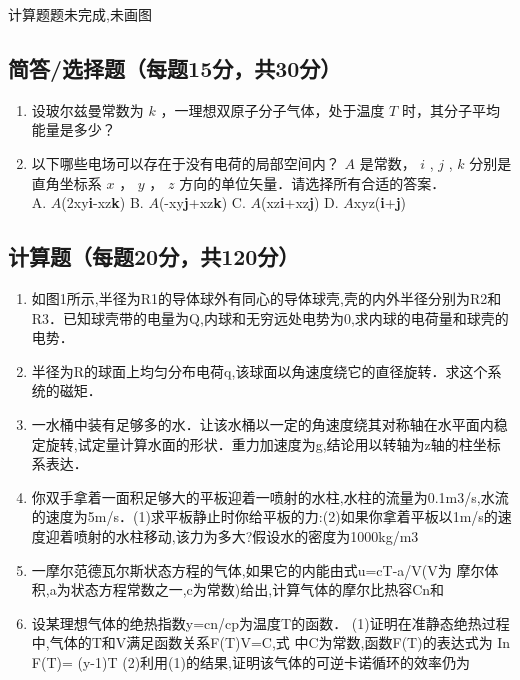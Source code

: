 
\begin{issues}
\issueTODO
计算题题未完成,未画图
\end{issues}


\subsection{简答/选择题（每题15分，共30分）}
\begin{enumerate}
\item 设玻尔兹曼常数为 $k$ ，一理想双原子分子气体，处于温度 $T$ 时，其分子平均能量是多少？
\item 以下哪些电场可以存在于没有电荷的局部空间内？ $A$ 是常数， $i$ , $j$ , $k$ 分别是直角坐标系 $x$ ， $y$ ， $z$ 方向的单位矢量．请选择所有合适的答案．\\
A. $A$(2xy\textbf{i}-xz\textbf{k}) B. $A$(-xy\textbf{j}+xz\textbf{k}) C. $A$(xz\textbf{i}+xz\textbf{j}) D. $A$xyz(\textbf{i}+\textbf{j})
\end{enumerate}
\subsection{计算题（每题20分，共120分）}
\begin{enumerate}
\item 如图1所示,半径为R1的导体球外有同心的导体球壳,壳的内外半径分别为R2和R3．已知球壳带的电量为Q,内球和无穷远处电势为0,求内球的电荷量和球壳的电势．
\item 半径为R的球面上均匀分布电荷q,该球面以角速度绕它的直径旋转．求这个系统的磁矩．
\item 一水桶中装有足够多的水．让该水桶以一定的角速度绕其对称轴在水平面内稳定旋转,试定量计算水面的形状．重力加速度为g,结论用以转轴为z轴的柱坐标系表达．
\item 你双手拿着一面积足够大的平板迎着一喷射的水柱,水柱的流量为0.1m3/s,水流的速度为5m/s．(1)求平板静止时你给平板的力:(2)如果你拿着平板以1m/s的速度迎着喷射的水柱移动,该力为多大?假设水的密度为1000kg/m3
\item 一摩尔范德瓦尔斯状态方程的气体,如果它的内能由式u=cT-a/V(V为
摩尔体积,a为状态方程常数之一,c为常数)给出,计算气体的摩尔比热容Cn和
\item 设某理想气体的绝热指数y=cn/cp为温度T的函数．
(1)证明在准静态绝热过程中,气体的T和V满足函数关系F(T)V=C,式
中C为常数,函数F(T)的表达式为
In F(T)=
(y-1)T
(2)利用(1)的结果,证明该气体的可逆卡诺循环的效率仍为
\end{enumerate}